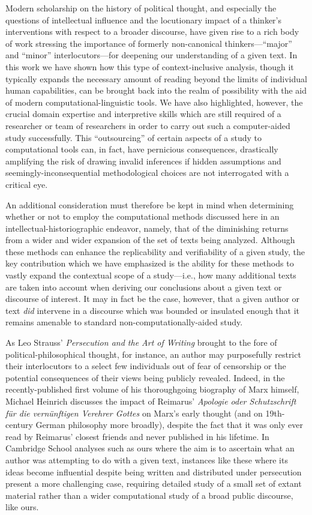 Modern scholarship on the history of political thought, and especially the questions of intellectual influence and the locutionary impact of a thinker's interventions with respect to a broader discourse, have given rise to a rich body of work stressing the importance of formerly non-canonical thinkers---``major'' and ``minor'' interlocutors---for deepening our understanding of a given text. In this work we have shown how this type of context-inclusive analysis, though it typically expands the necessary amount of reading beyond the limits of individual human capabilities, can be brought back into the realm of possibility with the aid of modern computational-linguistic tools. We have also highlighted, however, the crucial domain expertise and interpretive skills which are still required of a researcher or team of researchers in order to carry out such a computer-aided study successfully. This ``outsourcing'' of certain aspects of a study to computational tools can, in fact, have pernicious consequences, drastically
amplifying the risk of drawing invalid inferences if hidden assumptions and seemingly-inconsequential methodological choices are not interrogated with a critical eye.

An additional consideration must therefore be kept in mind when determining whether or not to employ the computational methods discussed here in an intellectual-historiographic endeavor, namely, that of the diminishing returns from a wider and wider expansion of the set of texts being analyzed. Although these methods can enhance the replicability and verifiability of a given study, the key contribution which we have emphasized is the ability for these methods to vastly expand the contextual scope of a study---i.e., how many additional texts are taken into account when deriving our conclusions about a given text or discourse of interest. It may in fact be the case, however, that a given author or text \textit{did} intervene in a discourse which was bounded or insulated enough that it remains amenable to standard non-computationally-aided study.

As Leo Strauss' \textit{Persecution and the Art of Writing} brought to the fore of political-philosophical thought, for instance, an author may purposefully restrict their interlocutors to a select few individuals out of fear of censorship or the potential consequences of their views being publicly revealed. Indeed, in the recently-published first volume of his thoroughgoing biography of Marx himself, Michael Heinrich discusses the impact of Reimarus' \textit{Apologie oder Schutzschrift für die vernünftigen Verehrer Gottes} on Marx's early thought (and on 19th-century German philosophy more broadly), despite the fact that it was only ever read by Reimarus' closest friends and never published in his lifetime. In Cambridge School analyses such as ours where the aim is to ascertain what an author was attempting to do with a given text, instances like these where its ideas become influential despite being written and distributed under persecution present a more challenging case, requiring detailed study of a small set of extant material rather than a wider computational study of a broad public discourse, like ours.

